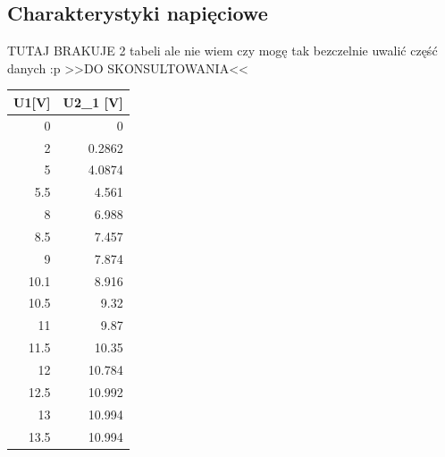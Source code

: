 \documentclass[a4paper,12pt]{article}
\begin{document}
\subsection{Charakterystyki napięciowe}
TUTAJ BRAKUJE 2 tabeli ale nie wiem czy mogę tak bezczelnie uwalić część danych :p >>DO SKONSULTOWANIA<<
\begin{table}[ht]
  \centering
  \begin{tabular}{|r|r|}
    \hline
    \multicolumn{1}{|c|}{\textbf{U1{[}V{]}}} & \multicolumn{1}{c|}{\textbf{U2\_1 {[}V{]}}} \\ \hline
    0                                        & 0                                           \\ \hline
    2                                        & 0.2862                                      \\ \hline
    5                                        & 4.0874                                      \\ \hline
    5.5                                      & 4.561                                       \\ \hline
    8                                        & 6.988                                       \\ \hline
    8.5                                      & 7.457                                       \\ \hline
    9                                        & 7.874                                       \\ \hline
    10.1                                     & 8.916                                       \\ \hline
    10.5                                     & 9.32                                        \\ \hline
    11                                       & 9.87                                        \\ \hline
    11.5                                     & 10.35                                       \\ \hline
    12                                       & 10.784                                      \\ \hline
    12.5                                     & 10.992                                      \\ \hline
    13                                       & 10.994                                      \\ \hline
    13.5                                     & 10.994                                      \\ \hline

\end{tabular}
\end{table}
\end{document}
